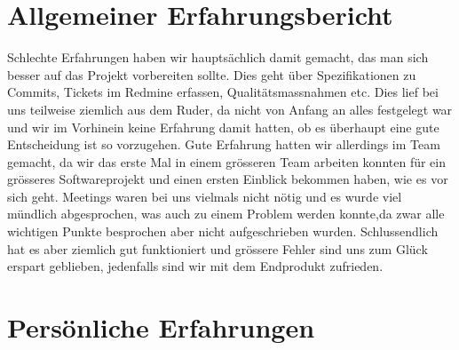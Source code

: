 \documentclass[11pt]{scrartcl}
\begin{document}
\section{Allgemeiner Erfahrungsbericht}
Schlechte Erfahrungen haben wir hauptsächlich damit gemacht, 
das man sich besser auf das Projekt vorbereiten sollte.
Dies geht über Spezifikationen zu Commits, 
Tickets im Redmine erfassen, Qualitätsmassnahmen etc.
Dies lief bei uns teilweise ziemlich aus dem Ruder, 
da nicht von Anfang an alles
 festgelegt war und wir im Vorhinein keine Erfahrung damit hatten, ob es 
 überhaupt eine gute Entscheidung ist so vorzugehen.
 Gute Erfahrung hatten wir allerdings im Team gemacht, da wir das erste Mal
 in einem grösseren Team arbeiten konnten für ein grösseres Softwareprojekt
 und einen ersten Einblick bekommen haben, wie es vor sich geht.
 Meetings waren bei uns vielmals nicht nötig und es wurde viel
 mündlich abgesprochen, was auch zu einem Problem werden konnte,da
 zwar alle wichtigen Punkte besprochen aber nicht aufgeschrieben wurden.
 Schlussendlich hat es aber ziemlich gut funktioniert und grössere Fehler
 sind uns zum Glück erspart geblieben, jedenfalls sind wir mit dem Endprodukt
  zufrieden.
  \newpage
\section{Persönliche Erfahrungen}
\end{document}
